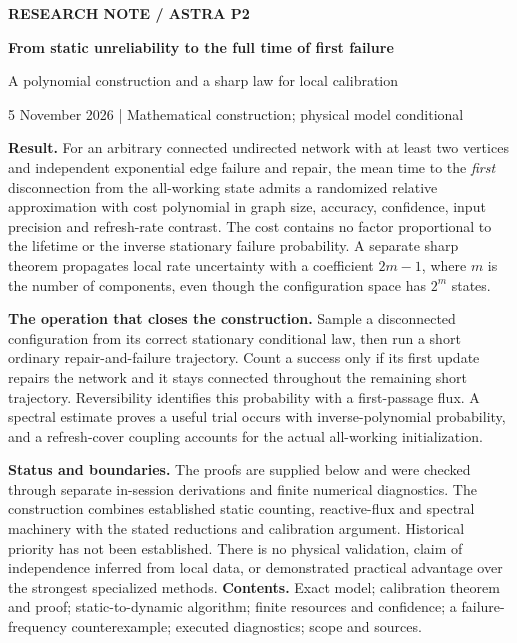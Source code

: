 \documentclass[11pt,a4paper]{article}
\begin{document}
\hypersetup{pageanchor=false}
\begin{titlepage}
\vspace*{12mm}
{\small\color{accent}\bfseries RESEARCH NOTE \quad / \quad ASTRA P2}\par
\vspace{8mm}
{\LARGE\color{ink}\bfseries From static unreliability to the full time of first failure}\par
\vspace{4mm}
{\Large A polynomial construction and a sharp law for local calibration}\par
\vspace{7mm}
{5 November 2026 \quad | \quad Mathematical construction; physical model conditional}\par
\vspace{9mm}
\colorbox{pale}{\parbox{\dimexpr\textwidth-2\fboxsep\relax}{\textbf{Result.}
For an arbitrary connected undirected network with at least two vertices and independent exponential edge failure and repair, the mean time to the \emph{first} disconnection from the all-working state admits a randomized relative approximation with cost polynomial in graph size, accuracy, confidence, input precision and refresh-rate contrast. The cost contains no factor proportional to the lifetime or the inverse stationary failure probability. A separate sharp theorem propagates local rate uncertainty with a coefficient $2m-1$, where $m$ is the number of components, even though the configuration space has $2^m$ states.}}\par
\vspace{8mm}
\textbf{The operation that closes the construction.}
Sample a disconnected configuration from its correct stationary conditional law, then run a short ordinary repair-and-failure trajectory. Count a success only if its first update repairs the network and it stays connected throughout the remaining short trajectory. Reversibility identifies this probability with a first-passage flux. A spectral estimate proves a useful trial occurs with inverse-polynomial probability, and a refresh-cover coupling accounts for the actual all-working initialization.\par
\vspace{5mm}
\textbf{Status and boundaries.}
The proofs are supplied below and were checked through separate in-session derivations and finite numerical diagnostics. The construction combines established static counting, reactive-flux and spectral machinery with the stated reductions and calibration argument. Historical priority has not been established. There is no physical validation, claim of independence inferred from local data, or demonstrated practical advantage over the strongest specialized methods.
\vfill
\textbf{Contents.} Exact model; calibration theorem and proof; static-to-dynamic algorithm; finite resources and confidence; a failure-frequency counterexample; executed diagnostics; scope and sources.
\end{titlepage}
\hypersetup{pageanchor=true}
\end{document}
